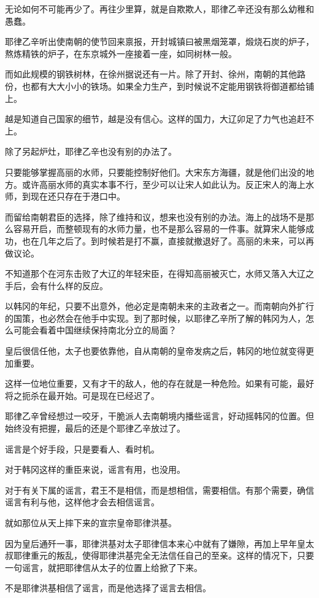 无论如何不可能再少了。再往少里算，就是自欺欺人，耶律乙辛还没有那么幼稚和愚蠢。

耶律乙辛听出使南朝的使节回来禀报，开封城镇曰被黑烟笼罩，煅烧石炭的炉子，熬炼精铁的炉子，在东京城外一座接着一座，如同树林一般。

而如此规模的钢铁树林，在徐州据说还有一片。除了开封、徐州，南朝的其他路份，也都有大大小小的铁场。如果全力生产，到时候说不定能用钢铁将御道都给铺上。

越是知道自己国家的细节，越是没有信心。这样的国力，大辽卯足了力气也追赶不上。

除了另起炉灶，耶律乙辛也没有别的办法了。

只要能够掌握高丽的水师，只要能控制好他们。大宋东方海疆，就是他们出没的地方。或许高丽水师的真实本事不行，至少可以让宋人如此认为。反正宋人的海上水师，到现在还只存在于港口中。

而留给南朝君臣的选择，除了维持和议，想来也没有别的办法。海上的战场不是那么容易开启，而整顿现有的水师力量，也不是那么容易的一件事。就算宋人能够成功，也在几年之后了。到时候若是打不赢，直接就撤退好了。高丽的未来，可以再做议论。

不知道那个在河东击败了大辽的年轻宋臣，在得知高丽被灭亡，水师又落入大辽之手后，会有什么样的反应。

以韩冈的年纪，只要不出意外，他必定是南朝未来的主政者之一。而南朝向外扩行的国策，也必然会在他手中实现。到了那时候，以耶律乙辛所了解的韩冈为人，怎么可能会看着中国继续保持南北分立的局面？

皇后很信任他，太子也要依靠他，自从南朝的皇帝发病之后，韩冈的地位就变得更加重要。

这样一位地位重要，又有才干的敌人，他的存在就是一种危险。如果有可能，最好将之扼杀在最开始。可是现在已经迟了。

耶律乙辛曾经想过一咬牙，干脆派人去南朝境内播些谣言，好动摇韩冈的位置。但始终没有把握，最后的还是个耶律乙辛放过了。

谣言是个好手段，只是要看人、看时机。

对于韩冈这样的重臣来说，谣言有用，也没用。

对于有关下属的谣言，君王不是相信，而是想相信，需要相信。有那个需要，确信谣言有利与他，这样他才会去相信谣言。

就如那位从天上摔下来的宣宗皇帝耶律洪基。

因为皇后通歼一事，耶律洪基对太子耶律信本来心中就有了嫌隙，再加上早年皇太叔耶律重元的叛乱，使得耶律洪基完全无法信任自己的至亲。这样的情况下，只要一句谣言，就把耶律信从太子的位置上给掀了下来。

不是耶律洪基相信了谣言，而是他选择了谣言去相信。


